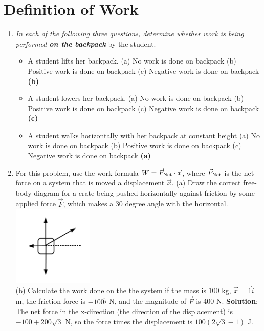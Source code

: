 \documentclass[10pt]{article}
\begin{document}
\maketitle

\section{Definition of Work}
\begin{enumerate}
\item \textit{In each of the following three questions, determine whether work is being performed \textbf{on the backpack}} by the student.
\begin{itemize}
\item A student lifts her backpack. (a) No work is done on backpack (b) Positive work is done on backpack (c) Negative work is done on backpack \textbf{(b)}
\item A student lowers her backpack.  (a) No work is done on backpack (b) Positive work is done on backpack (c) Negative work is done on backpack \textbf{(c)}
\item A student walks horizontally with her backpack at constant height  (a) No work is done on backpack (b) Positive work is done on backpack (c) Negative work is done on backpack \textbf{(a)}
\end{itemize}
\item For this problem, use the work formula $W = \vec{F}_{\rm Net} \cdot \vec{x}$, where $\vec{F}_{\rm Net}$ is the net force on a system that is moved a displacement $\vec{x}$.  (a) Draw the correct free-body diagram for a crate being pushed horizontally against friction by some applied force $\vec{F}$, which makes a 30 degree angle with the horizontal.  \\
\includegraphics[width=0.3\textwidth]{figures/FBD1.pdf} \\
(b) Calculate the work done on the the system if the mass is 100 kg, $\vec{x} = 1 \hat{i}$ m, the friction force is $-100\hat{i}$ N, and the magnitude of $\vec{F}$ is 400 N. \textbf{Solution}: The net force in the x-direction (the direction of the displacement) is $-100 + 200\sqrt{3}$ N, so the force times the displacement is $100(2\sqrt{3}-1)$ J.
\end{enumerate}
\end{document}
